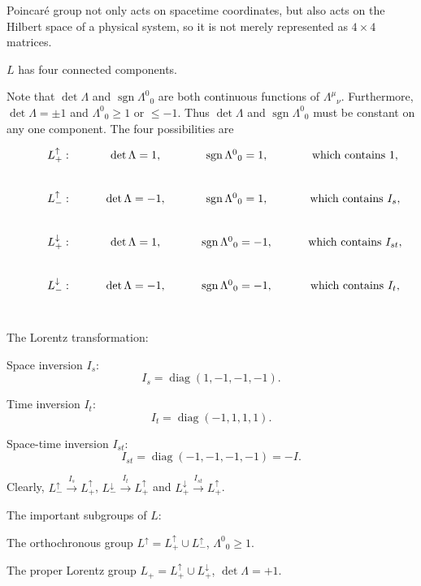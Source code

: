 \begin{remark}
    Poincaré group not only acts on spacetime coordinates, but also acts on the Hilbert space of a physical system,
so it is not merely represented as  $4\times 4$ matrices.
\end{remark}

    \qquad $L$ has four connected components.

    \qquad Note that $\det \Lambda$ and $\operatorname{sgn} {\Lambda^0}_0$ are both continuous functions of ${\Lambda^\mu}_\nu$.
Furthermore, $\det \Lambda=\pm 1$ and ${\Lambda^0}_0 \geq 1$ or $\leq -1$. Thus $\det \Lambda$ and $\operatorname{sgn} {\Lambda^0}_0$ must be constant on any one component. 
The four possibilities are
        $$\begin{tikzcd}
            &L_+^{\uparrow}: &\det \Lambda =1, &\operatorname{sgn} {\Lambda^0}_0=1, &\text{which contains}\ 1,\\
            &L_-^{\uparrow}: &\det \Lambda =-1, &\operatorname{sgn} {\Lambda^0}_0=1, &\text{which contains}\ I_s,\\
            &L_+^{\downarrow}: &\det \Lambda =1, &\operatorname{sgn} {\Lambda^0}_0=-1, &\text{which contains}\ I_{st},\\
            &L_-^{\downarrow}: &\det \Lambda =-1, &\operatorname{sgn} {\Lambda^0}_0=-1, &\text{which contains}\ I_t,\\
        \end{tikzcd}$$

    \qquad The Lorentz transformation:

    \qquad Space inversion $I_s$: 
            $$I_s=\operatorname{diag}(1,-1,-1,-1).$$

    \qquad Time inversion $I_t$: 
            $$I_t=\operatorname{diag}(-1,1,1,1).$$
    
    \qquad Space-time inversion $I_{st}$: 
            $$I_{st}=\operatorname{diag}(-1,-1,-1,-1)=-I.$$

    \qquad Clearly, $L^{\uparrow}_- \xrightarrow{I_s} L^{\uparrow}_+$, $L^{\downarrow}_- \xrightarrow{I_t} L^{\uparrow}_+$ and $L^{\downarrow}_+ \xrightarrow{I_{st}}L^{\uparrow}_+$.

    \qquad The important subgroups of $L$:

        \qquad \qquad The orthochronous group $L^{\uparrow} =L^{\uparrow}_+ \cup L^{\uparrow}_-$, ${\Lambda^0}_0\geq 1$.

        \qquad \qquad The proper Lorentz group $L_+ = L_+^{\uparrow} \cup L_+^{\downarrow}$, $\det \Lambda =+1$.

